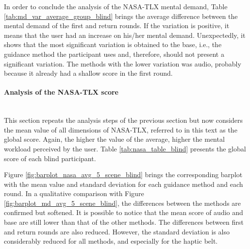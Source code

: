 

In order to conclude the analysis of the NASA-TLX mental demand, Table \ref{tab:md_var_average_group_blind} brings the average difference between the mental demand of the first and return rounds. If the variation is positive, it means that the user had an increase on his/her mental demand. Unexpectedly, it shows that the most significant variation is obtained to the base, i.e., the guidance method the participant uses and, therefore, should not present a significant variation. The methods with the lower variation was audio, probably because it already had a shallow score in the first round. 



\FloatBarrier



\paragraph{Analysis of the NASA-TLX score}\mbox{}\\

This section repeats the analysis steps of the previous section but now considers the mean value of all dimensions of NASA-TLX, referred to in this text as the global score. Again, the higher the value of the average, higher the mental workload perceived by the user. Table \ref{tab:nasa_table_blind} presents the global score of each blind participant. 



Figure \ref{fig:barplot_nasa_avg_5_scene_blind} brings the corresponding barplot with the mean value and standard deviation for each guidance method and each round. In a qualitative comparison with Figure \ref{fig:barplot_md_avg_5_scene_blind}, the differences between the methods are confirmed but softened. It is possible to notice that the mean score of audio and base are still lower than that of the other methods. The differences between first and return rounds are also reduced. However, the standard deviation is also considerably reduced for all methods, and especially for the haptic belt.

